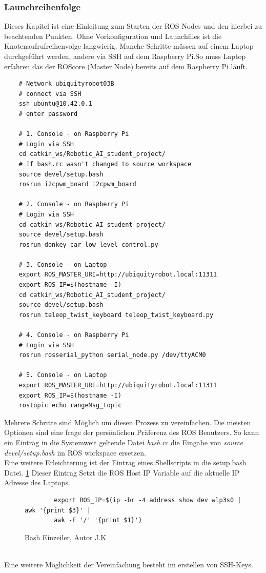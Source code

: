 \documentclass[conference]{IEEEtran}
\begin{document}
	\subsubsection{Launchreihenfolge}%
	
	Dieses Kapitel ist eine Einleitung zum Starten der ROS Nodes und den 
	hierbei zu beachtenden Punkten. Ohne Vorkonfiguration und Launchfiles ist 
	die Knotenaufrufreihenvolge langwierig. Manche Schritte müssen auf einem 
	Laptop durchgeführt werden, andere via SSH auf dem Raspberry Pi.So muss 
	Laptop erfahren das der ROScore (Master Node) bereits auf dem Raspberry 
	Pi läuft.
	
	\begin{verbatim}
	# Network ubiquityrobot03B
	# connect via SSH
	ssh ubuntu@10.42.0.1
	# enter password
	
	# 1. Console - on Raspberry Pi
	# Login via SSH
	cd catkin_ws/Robotic_AI_student_project/
	# If bash.rc wasn't changed to source workspace
	source devel/setup.bash
	rosrun i2cpwm_board i2cpwm_board
	
	# 2. Console - on Raspberry Pi
	# Login via SSH
	cd catkin_ws/Robotic_AI_student_project/
	source devel/setup.bash
	rosrun donkey_car low_level_control.py
	
	# 3. Console - on Laptop 
	export ROS_MASTER_URI=http://ubiquityrobot.local:11311
	export ROS_IP=$(hostname -I)
	cd catkin_ws/Robotic_AI_student_project/
	source devel/setup.bash
	rosrun teleop_twist_keyboard teleop_twist_keyboard.py
	
	# 4. Console - on Raspberry Pi
	# Login via SSH
	rosrun rosserial_python serial_node.py /dev/ttyACM0
	
	# 5. Console - on Laptop
	export ROS_MASTER_URI=http://ubiquityrobot.local:11311
	export ROS_IP=$(hostname -I)
	rostopic echo rangeMsg_topic
	\end{verbatim}
	
	Mehrere Schritte sind Möglich um diesen Prozess zu vereinfachen. Die 
	meisten Optionen sind eine frage der persönlichen Präferenz des ROS 
	Benutzers.  So kann ein Eintrag in die Systemweit geltende Datei 
	\textit{bash.rc} die Eingabe von \textit{source devel/setup.bash} im ROS 
	workspace ersetzen. \\
	Eine weitere Erleichterung ist der Eintrag eines Shellscripts in die 
	setup.bash Datei. \ref{Einzeiler} Dieser Eintrag Setzt die ROS Host IP 
	Variable auf die aktuelle IP Adresse des Laptops.
	\begin{figure}
		\centering
		\begin{verbatim}
		export ROS_IP=$(ip -br -4 address show dev wlp3s0 | awk '{print $3}' | 
		awk -F '/' '{print $1}')
		\end{verbatim}
		\label{Einzeiler}
		\caption{Bash Einzeiler, Autor J.K }
	\end{figure}
	\\
	Eine weitere Möglichkeit der Vereinfachung besteht im erstellen von 
	SSH-Keys. 
	
\end{document}
